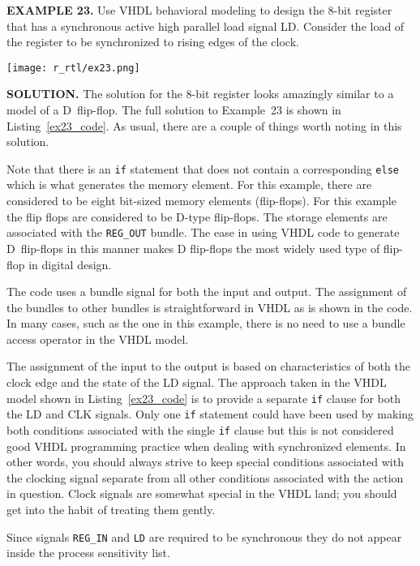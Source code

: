 \begin{leftbar}
\begin{minipage}[t]{0.52\textwidth}
\vspace{10pt}
\noindent
\textbf{EXAMPLE 23.}
Use VHDL behavioral modeling to design the 8-bit register that has a synchronous active high parallel load signal LD. Consider the load of the register to be synchronized to rising edges of the clock.
\end{minipage}
\begin{minipage}[t]{0.45\textwidth}
\vspace{0pt}\raggedright
    \centering
	\texttt{[image: r\_rtl/ex23.png]}
\end{minipage}
\end{leftbar}
\noindent
\textbf{SOLUTION.} The solution for the 8-bit register looks amazingly similar to a model of a D~flip-flop. The full solution to Example~23 is shown in Listing~\ref{ex23_code}. As usual, there are a couple of things worth noting in this solution.
\begin{my_list}
\item Note that there is an \texttt{if} statement that does not contain a corresponding \texttt{else} which is what generates the memory element. For this example, there are considered to be eight bit-sized memory elements (flip-flops). For this example the flip flops are considered to be D-type flip-flops. The storage elements are associated with the \texttt{REG\_OUT} bundle. The ease in using VHDL code to generate D~flip-flops in this manner makes D flip-flops the most widely used type of flip-flop in digital design.

\item The code uses a bundle signal for both the input and output. The assignment of the bundles to other bundles is straightforward in VHDL as is shown in the code. In many cases, such as the one in this example, there is no need to use a bundle access operator in the VHDL model.

\item The assignment of the input to the output is based on characteristics of both the clock edge and the state of the LD signal. The approach taken in the VHDL model shown in Listing~\ref{ex23_code} is to provide a separate \texttt{if} clause for both the LD and CLK signals. Only one \texttt{if} statement could have been used by making both conditions associated with the single \texttt{if} clause but this is not considered good VHDL programming practice when dealing with synchronized elements. In other words, you should always strive to keep special conditions associated with the clocking signal separate from all other conditions associated with the action in question. Clock signals are somewhat special in the VHDL land; you should get into the habit of treating them gently.

\item Since signals \texttt{REG\_IN} and \texttt{LD} are required to be synchronous they do not appear inside the process sensitivity list.
\end{my_list}

